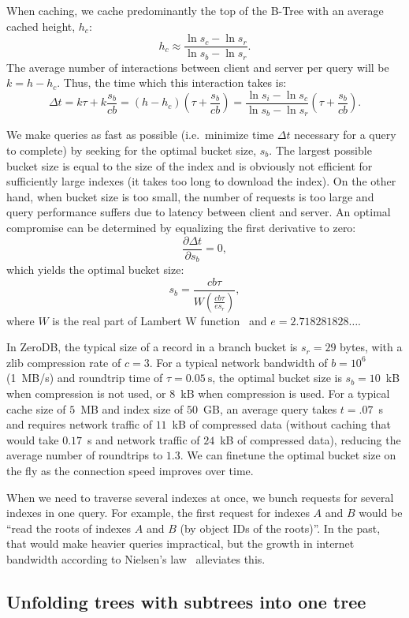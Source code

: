 \documentclass[notitlepage,longbibliography]{revtex4-1}
\begin{document}
When caching, we cache predominantly the top of the B-Tree with an average cached height, $h_c$:
$$h_c \approx \frac{\ln s_c - \ln s_r}{\ln s_b - \ln s_r}.$$
The average number of interactions between client and server per query will be $k = h - h_c$.
Thus, the time which this interaction takes is:
$$\Delta t = k\tau + k\frac{s_b}{cb} =
\left(h - h_c \right) \left( \tau + \frac{s_b}{cb} \right) =
\frac{\ln s_i - \ln s_c}{\ln s_b - \ln s_r} \left( \tau + \frac{s_b}{cb} \right).$$

We make queries as fast as possible (i.e.\ minimize time $\Delta t$ necessary for a query to complete) by seeking for the optimal bucket size, $s_b$.
The largest possible bucket size is equal to the size of the index and is obviously not efficient for sufficiently large indexes (it takes too long to download the index).
On the other hand, when bucket size is too small, the number of requests is too large and query performance suffers due to latency between client and server.
An optimal compromise can be determined by equalizing the first derivative to zero:
$$\frac{\partial \Delta t}{\partial s_b} = 0,$$
which yields the optimal bucket size:
$$s_b = \frac{cb\tau}{W\left( \frac{cb\tau}{e s_r}\right)},$$
where $W$ is the real part of Lambert W function~\cite{wiki:lambert}
and $e=2.718281828\ldots$.

In ZeroDB, the typical size of a record in a branch bucket is $s_r = 29$ bytes, with a zlib compression rate of $c=3$.
For a typical network bandwidth of $b=10^6$ (1~MB/s) and roundtrip time of $\tau=0.05~\mbox{s}$, the optimal bucket size is $s_b=10$~kB when compression is not used, or $8$~kB when compression is used.
For a typical cache size of $5$~MB and index size of $50$~GB,
an average query takes $t=.07$~s and requires network traffic of $11$~kB of compressed data (without caching that would take $0.17$~s and network traffic of $24$~kB of compressed data), reducing the average number of roundtrips to $1.3$.
We can finetune the optimal bucket size on the fly as the connection speed improves over time.

When we need to traverse several indexes at once, we bunch requests for several indexes in one query.
For example, the first request for indexes $A$ and $B$ would be ``read the roots of indexes $A$ and $B$ (by object IDs of the roots)''.
In the past, that would make heavier queries impractical, but the growth in internet bandwidth according to Nielsen's law~\cite{nielsen-law} alleviates this.

\subsection{Unfolding trees with subtrees into one tree}
\label{sec:unfold-trees}
\end{document}
